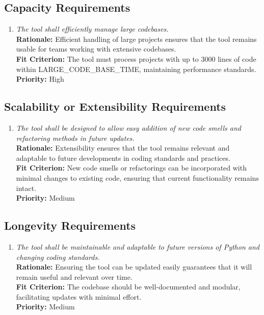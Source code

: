 \documentclass[12pt]{article}
\begin{document}
\subsection{Capacity Requirements}
\begin{enumerate}[label=PR-CR \arabic*., wide=0pt, leftmargin=*]
  \item \emph{The tool shall efficiently manage large codebases.}\\[2mm]
    {\bf Rationale:} Efficient handling of large projects ensures
    that the tool remains usable for teams working with extensive codebases.\\
    {\bf Fit Criterion:} The tool must process projects with up to
    3000 lines of code within LARGE\_CODE\_BASE\_TIME, maintaining
    performance standards.\\
    {\bf Priority:} High
\end{enumerate}

\subsection{Scalability or Extensibility Requirements}
\begin{enumerate}[label=PR-SER \arabic*., wide=0pt, leftmargin=*]
  \item \emph{The tool shall be designed to allow easy addition of
    new code smells and refactoring methods in future updates.}\\[2mm]
    {\bf Rationale:} Extensibility ensures that the tool remains
    relevant and adaptable to future developments in coding standards
    and practices.\\
    {\bf Fit Criterion:} New code smells or refactorings can be
    incorporated with minimal changes to existing code, ensuring that
    current functionality remains intact.\\
    {\bf Priority:} Medium
\end{enumerate}

\subsection{Longevity Requirements}
\begin{enumerate}[label=PR-LR \arabic*., wide=0pt, leftmargin=*]
  \item \emph{The tool shall be maintainable and adaptable to future
    versions of Python and changing coding standards.}\\[2mm]
    {\bf Rationale:} Ensuring the tool can be updated easily
    guarantees that it will remain useful and relevant over time.\\
    {\bf Fit Criterion:} The codebase should be well-documented and
    modular, facilitating updates with minimal effort.\\
    {\bf Priority:} Medium
\end{enumerate}
\end{document}
